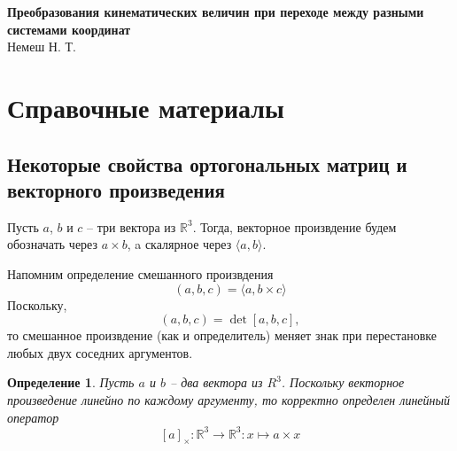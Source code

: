\documentclass[12pt]{article}
\newtheorem{definition}[theorem]{Определение}
\begin{document}
\begin{center}

    \Large \textbf{Преобразования кинематических величин при переходе между разными системами координат}\\[0.5cm]
    \small {Немеш Н. Т.}\\[0.5cm]

\end{center}
\date{March 2022}

\section{Справочные материалы}

\subsection{Некоторые свойства ортогональных матриц и векторного произведения}

Пусть $a$, $b$ и $c$ -- три вектора из $\mathbb{R}^3$.
Тогда, векторное произвдение будем обозначать через $a \times b$, a скалярное
через $\langle a,b\rangle$.

Напомним определение смешанного произвдения
$$
    (a, b, c)=\langle a, b\times c\rangle
$$
Поскольку,
$$
    (a, b, c)=\det[a, b, c],
$$
то смешанное произвдение (как и определитель) меняет знак при перестановке любых двух
соседних аргументов.


\begin{definition}
    Пусть $a$ и $b$ -- два вектора из $R^3$.
    Поскольку векторное произведение линейно по каждому аргументу,
    то корректно определен линейный оператор
    $$
        [a]_\times : \mathbb{R}^3\to\mathbb{R}^3: x\mapsto a\times x
    $$
\end{definition}
\end{document}
